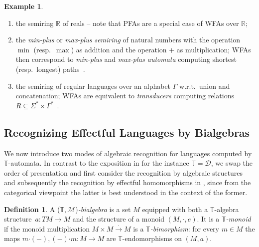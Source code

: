 \documentclass[a4paper, UKenglish, numberwithinsect, thm-restate, cleveref, final]{lipics-v2021}
\theoremstyle{plain}
\theoremstyle{definition}
\newtheorem{defn}[theorem]{Definition} \newtheorem{expl}[theorem]{Example} \newtheorem{rem}[theorem]{Remark} \newtheorem{notn}[theorem]{Notation} \newtheorem{assumption}[theorem]{Assumption}
\newcommand{\T}{\ensuremath{\mathbb{T}}\xspace}
\newcommand{\M}{\ensuremath{\mathcal{M}}\xspace}
\newcommand{\D}{\ensuremath{\mathcal{D}}}
\newcommand{\R}{\ensuremath{\mathds{R}}}
\newcommand{\xto}{\xrightarrow}
\newcommand{\mult}{\mathbin{\boldsymbol{\cdot}}}
\numberwithin{equation}{section}
\begin{document}
\begin{expl}
\begin{enumerate}[(1)]
          \begin{enumerate}[(1)]
            \item the semiring $\R$ of reals -- note that PFAs are a special case of WFAs over $\R$;
            \item the \emph{min-plus} or \emph{max-plus semiring} of natural numbers with the operation $\min$ (resp.\ $\max$) as addition and the operation $+$ as multiplication; WFAs then correspond to \emph{min-plus} and \emph{max-plus automata} computing shortest (resp.\ longest) paths~\cite[Ch.~5]{pin21_handbook}.
            \item the semiring of regular languages over an alphabet $\Gamma$ w.r.t.\ union and concatenation; WFAs are equivalent to \emph{transducers} computing relations $R\subseteq\Sigma^*\times \Gamma^*$~\cite[Ch.~3]{pin21_handbook}.
          \end{enumerate}
  \end{enumerate}
\end{expl}


\subsection{Recognizing Effectful Languages by Bialgebras}

We now introduce two modes of algebraic recognition for languages computed by $\T$-automata. In contrast
to the exposition in  for the instance $\T = \D$, we swap the order of presentation and first consider the recognition by algebraic structures and
subsequently the recognition by effectful homomorphisms in , since from the categorical viewpoint
the latter is best understood in the context of the former.



\begin{defn}\label{def:t-m-bialgebra}
  A ($\T,\M$)\emph{-bialgebra} is a set $M$ equipped with both a $\T$-algebra
  structure~$a\colon TM \to M$
  and the structure of a monoid $(M,\mult,e)$. It is a \emph{$\T$-monoid} if the monoid multiplication
  $M\times M\xto{\mult} M$ is a \emph{$\T$-bimorphism}: for every $m\in M$ the maps
  $m\mult(-), (-)\mult m\colon M\to M$ are $\T$-endomorphisms on $(M,a)$.
\end{defn}
\end{document}
